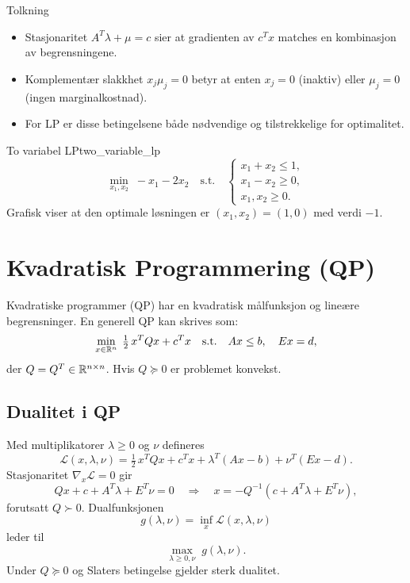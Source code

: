 \begin{remark}{Tolkning}{}
	\begin{itemize}
		\item Stasjonaritet $A^T\lambda+\mu=c$ sier at gradienten av $c^T x$ matches en kombinasjon av begrensningene.
		\item Komplementær slakkhet $x_j\mu_j=0$ betyr at enten $x_j=0$ (inaktiv) eller $\mu_j=0$ (ingen marginalkostnad).
		\item For LP er disse betingelsene både nødvendige og tilstrekkelige for optimalitet.
	\end{itemize}
\end{remark}

\begin{example}{To variabel LP}{two_variable_lp}
	\[
		\min_{x_1,x_2}\;-x_1 - 2x_2
		\quad\text{s.t.}\quad
		\begin{cases}
			x_1 + x_2 \le 1, \\
			x_1 - x_2 \ge 0, \\
			x_1,x_2\ge0.
		\end{cases}
	\]
	Grafisk viser at den optimale løsningen er $(x_1,x_2)=(1,0)$ med verdi $-1$.
\end{example}

\section{Kvadratisk Programmering (QP)}
Kvadratiske programmer (QP) har en kvadratisk målfunksjon og lineære begrensninger.
En generell QP kan skrives som:
\[
	\min_{x\in\mathbb{R}^n}\;\tfrac12\,x^T Q x + c^T x
	\quad\text{s.t.}\quad
	A x \le b,\quad
	E x = d,
\]
der $Q=Q^T\in\mathbb{R}^{n\times n}$. Hvis $Q\succeq0$ er problemet konvekst.

\subsection{Dualitet i QP}
Med multiplikatorer $\lambda\ge0$ og $\nu$ defineres
\[
	\mathcal L(x,\lambda,\nu)
	= \tfrac12\,x^T Q x + c^T x + \lambda^T(Ax-b) + \nu^T(Ex-d).
\]
Stasjonaritet $\nabla_x\mathcal L=0$ gir
\[
	Qx + c + A^T\lambda + E^T\nu = 0
	\quad\Longrightarrow\quad
	x = -Q^{-1}(c + A^T\lambda + E^T\nu),
\]
forutsatt $Q\succ0$. Dualfunksjonen
\[
	g(\lambda,\nu)
	= \inf_{x}\mathcal L(x,\lambda,\nu)
\]
leder til
\[
	\max_{\lambda\ge0,\nu}\;g(\lambda,\nu).
\]
Under $Q\succeq0$ og Slaters betingelse gjelder sterk dualitet.

